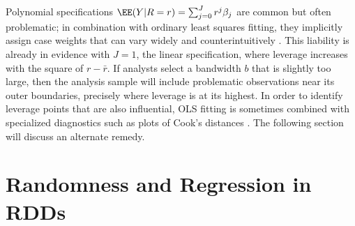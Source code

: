 Polynomial specifications
$\EE(Y | R=r) = \sum_{j=0}^{J} r^{j} \beta_{j}$ are common but often
problematic; in combination with ordinary least squares fitting, they
implicitly assign case weights that can vary widely and
counterintuitively \citep{gelman2016high}.
This liability is already
in evidence with $J=1$, the linear specification, where leverage
increases with the square of $r -\bar{r}$.
If analysts select a bandwidth $b$ that is slightly too large, then
the analysis sample will include problematic observations near its outer
boundaries, precisely where leverage is at its highest.
In order to identify leverage points that are also influential,
OLS fitting is sometimes combined with specialized diagnostics such as
plots of Cook's distances \citeyearpar{cook1982residuals}.
The following section will discuss an alternate remedy.




\section{Randomness and Regression in RDDs}\label{sec:theMethod}


